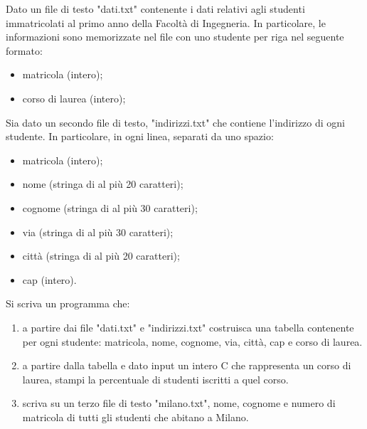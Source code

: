 \begin{Exercise}[label={ex:studenti}]
    Dato un file di testo "dati.txt" contenente i dati relativi agli studenti
    immatricolati al primo anno della Facoltà di Ingegneria. In particolare, le informazioni
    sono memorizzate nel file con uno studente per riga nel seguente formato:
    \begin{itemize}
        \item matricola (intero);
        \item corso di laurea (intero);
    \end{itemize}
    Sia dato un secondo file di testo, "indirizzi.txt" che contiene l'indirizzo di ogni studente.
    In particolare, in ogni linea, separati da uno spazio: 
    \begin{itemize}
        \item matricola (intero);   
        \item nome (stringa di al più 20 caratteri);
        \item cognome (stringa di al più 30 caratteri);
        \item via (stringa di al più 30 caratteri);
        \item città (stringa di al più 20 caratteri);
        \item cap (intero).
    \end{itemize}
    Si scriva un programma che:
    \begin{enumerate}
        \item a partire dai file "dati.txt" e "indirizzi.txt" costruisca una tabella
        contenente per ogni studente: matricola, nome, cognome, via, città, cap e corso di laurea.
        \item a partire dalla tabella e dato input un intero C che rappresenta un corso di laurea,
        stampi la percentuale di studenti iscritti a quel corso.
        \item scriva su un terzo file di testo "milano.txt", nome, cognome e numero di matricola
        di tutti gli studenti che abitano a Milano.
    \end{enumerate}
\end{Exercise}

\begin{Answer}[ref={ex:studenti}]
  	
\end{Answer}